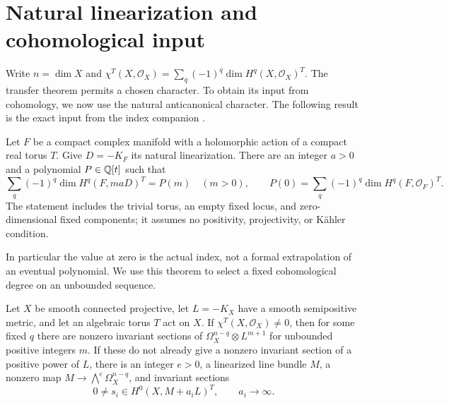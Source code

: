 \section{Natural linearization and cohomological input}\label{sec:cohomological-input}
Write $n=\dim X$ and $\chi^T(X,\mathcal O_X)=\sum_q(-1)^q\dim H^q(X,\mathcal O_X)^T$. The transfer theorem permits a chosen character. To obtain its input from cohomology, we now use the natural anticanonical character. The following result is the exact input from the index companion \cite[Invariant anticanonical index theorem]{CompanionI}.

\begin{proposition}\label{har:prop:index}
Let $F$ be a compact complex manifold with a holomorphic action of a compact real torus $T$. Give $D=-K_F$ its natural linearization. There are an integer $a>0$ and a polynomial $P\in\mathbb Q[t]$ such that
\[
 \sum_q(-1)^q\dim H^q(F,maD)^T=P(m)\quad(m>0),\qquad
 P(0)=\sum_q(-1)^q\dim H^q(F,\mathcal O_F)^T.
\]
The statement includes the trivial torus, an empty fixed locus, and zero-dimensional fixed components; it assumes no positivity, projectivity, or K\"ahler condition.
\end{proposition}

In particular the value at zero is the actual index, not a formal extrapolation of an eventual polynomial. We use this theorem to select a fixed cohomological degree on an unbounded sequence.

\begin{lemma}\label{har:lem:forms}
Let \(X\) be smooth connected projective, let \(L=-K_X\) have a smooth
semipositive metric, and let an algebraic torus \(T\) act on \(X\).
If \(\chi^T(X,\mathcal O_X)\ne0\), then for some fixed \(q\) there are
nonzero invariant sections of
\(\Omega_X^{n-q}\otimes L^{m+1}\) for unbounded positive integers \(m\).
If these do not already give a nonzero invariant section of a positive power of $L$, there
is an integer $e>0$, a linearized line bundle \(M\), a nonzero map
\(M\to\bigwedge^e\Omega_X^{n-q}\), and invariant sections
\[
 0\ne s_i\in H^0(X,M+a_iL)^T,\qquad a_i\longrightarrow\infty.
\]
\end{lemma}

